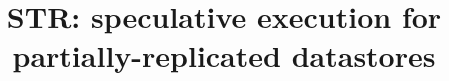 \documentclass[preprint]{sigplanconf-eurosys}
\begin{document}
\newcommand\VRule[1][\arrayrulewidth]{\vrule width #1}
\newcommand{\specula}{STR\xspace}

\title{STR: speculative execution for partially-replicated datastores}




\end{document}
